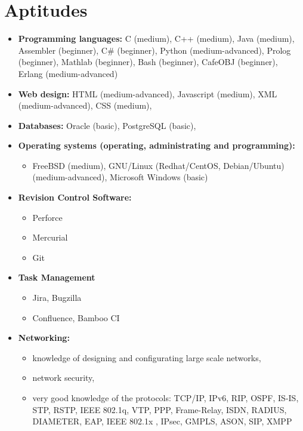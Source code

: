 \section{Aptitudes}
	\begin{itemize}
	 	\item \textbf{Programming languages: } C (medium), C++ (medium), Java (medium), Assembler (beginner), C\# (beginner), Python (medium-advanced), Prolog (beginner), Mathlab (beginner), Bash (beginner), CafeOBJ (beginner), Erlang (medium-advanced)
		\item \textbf{Web design:} HTML (medium-advanced), Javascript (medium), XML (medium-advanced), CSS (medium),
		\item \textbf{Databases:} Oracle (basic), PostgreSQL (basic),
		\item \textbf{Operating systems (operating, administrating and programming): }
			\begin{itemize}
			 	\item FreeBSD (medium), GNU/Linux (Redhat/CentOS, Debian/Ubuntu) (medium-advanced), Microsoft Windows (basic)
			\end{itemize}

		\item \textbf{Revision Control Software:}
			\begin{itemize}
				\item Perforce
				\item Mercurial
				\item Git
			\end{itemize}

		\item \textbf{Task Management}	
			\begin{itemize}
				\item Jira, Bugzilla
				\item Confluence, Bamboo CI
			\end{itemize}	
		\item \textbf{Networking:}
			\begin{itemize}
			 	\item knowledge of designing and configurating large scale networks, 
				\item network security, 
				\item very good knowledge of the protocols: TCP/IP, IPv6, RIP, OSPF, IS-IS, STP, RSTP, IEEE 802.1q, VTP, PPP, Frame-Relay, ISDN, RADIUS, DIAMETER, EAP, IEEE 802.1x , IPsec, GMPLS, ASON, SIP, XMPP
			\end{itemize}


\end{itemize}

